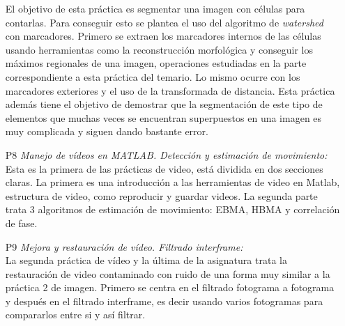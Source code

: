 \begin{itemize}
	El objetivo de esta práctica es segmentar una imagen con células para contarlas. Para conseguir esto se plantea el uso del algoritmo de \emph{watershed} con marcadores. Primero se extraen los marcadores internos de las células usando herramientas como la reconstrucción morfológica y conseguir los máximos regionales de una imagen, operaciones estudiadas en la parte correspondiente a esta práctica del temario. Lo mismo ocurre con los marcadores exteriores y el uso de la transformada de distancia. Esta práctica además tiene el objetivo de demostrar que la segmentación de este tipo de elementos que muchas veces se encuentran superpuestos en una imagen es muy complicada y siguen dando bastante error.
  \item [P8]\emph{Manejo de vídeos en MATLAB. Detección y estimación de movimiento:}\\
	Esta es la primera de las prácticas de video, está dividida en dos secciones claras. La primera es una introducción a las herramientas de video en Matlab, estructura de video, como reproducir y guardar videos. La segunda parte trata 3 algoritmos de estimación de movimiento: EBMA, HBMA y correlación de fase.
  \item [P9]\emph{Mejora y restauración de vídeo. Filtrado interframe:}\\
	La segunda práctica de vídeo y la última de la asignatura trata la restauración de video contaminado con ruido de una forma muy similar a la práctica 2 de imagen. Primero se centra en el filtrado fotograma a fotograma y después en el filtrado interframe, es decir usando varios fotogramas para compararlos entre si y así filtrar.
\end{itemize}

